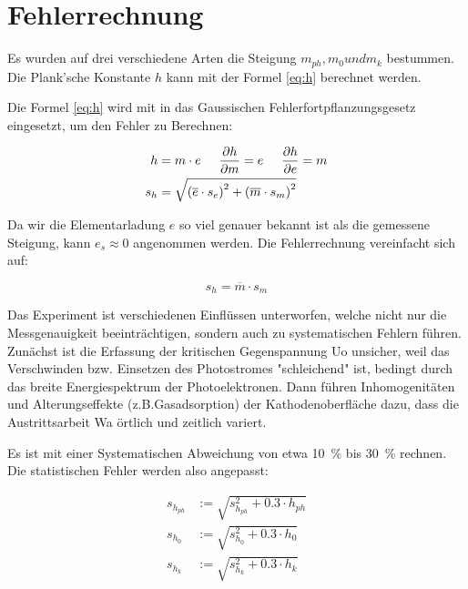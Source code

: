 \section{Fehlerrechnung}

Es  wurden  auf drei verschiedene Arten die Steigung  $m_{ph},  m_0  und  m_k$
bestummen.  Die  Plank'sche  Konstante  $h$  kann mit  der  Formel  \ref{eq:h}
berechnet werden.

Die Formel \ref{eq:h} wird mit in  das  Gaussischen Fehlerfortpflanzungsgesetz
eingesetzt, um den Fehler zu Berechnen:

\begin{align*}
    h &= m \cdot e \hspace{5mm} \frac{\partial h}{\partial m} = e \hspace{5mm} \frac{\partial h}{\partial e} = m \\
    s_h &= \sqrt{\left(\overline{e} \cdot s_e\right)^2 + \left(\overline{m} \cdot s_m\right)^2}
\end{align*}

Da  wir  die Elementarladung $e$ so viel genauer bekannt ist als die gemessene
Steigung,  kann   $e_s   \approx  0$  angenommen  werden.  Die  Fehlerrechnung
vereinfacht sich auf:

\begin{equation*}
    s_h = \overline{m} \cdot s_m
\end{equation*}

Das Experiment  ist  verschiedenen  Einfl\"ussen unterworfen, welche nicht nur
die  Messgenauigkeit beeintr\"achtigen, sondern auch zu systematischen Fehlern
f\"uhren.  Zun\"achst  ist  die  Erfassung  der  kritischen  Gegenspannung  Uo
unsicher, weil das Verschwinden  bzw. Einsetzen des Photostromes "schleichend"
ist,  bedingt  durch  das  breite  Energiespektrum  der  Photoelektronen. Dann
f\"uhren   Inhomogenit\"aten  und  Alterungseffekte  (z.B.Gasadsorption)   der
Kathodenoberfl\"ache dazu, dass die Austrittsarbeit  Wa \"ortlich und zeitlich
variert.

Es ist mit  einer  Systematischen  Abweichung  von  etwa \SI{10}{\percent} bis
\SI{30}{\percent} rechnen. Die  statistischen  Fehler  werden  also angepasst:

\begin{align*}
    s_{h_{ph}} &:= \sqrt{s_{h_{ph}}^2 + 0.3 \cdot h_{ph}} \\
    s_{h_0}    &:= \sqrt{s_{h_0}^2 + 0.3 \cdot h_0} \\
    s_{h_k}    &:= \sqrt{s_{h_k}^2 + 0.3 \cdot h_k}
\end{align*}

